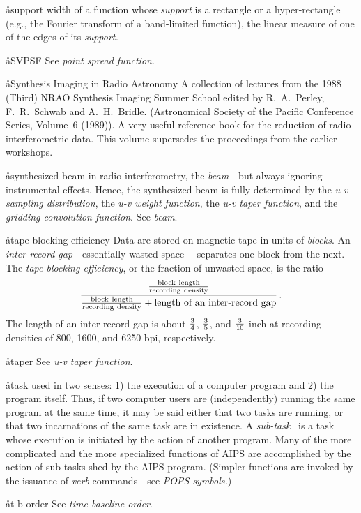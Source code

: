 \aa{support width}
of a function whose {\it support} is a rectangle or
a hyper-rectangle (e.g., the Fourier transform of a band-limited function),
the linear measure of one of the edges of its {\it support.}

\aa{SVPSF} See {\it point spread function}.

\aa{Synthesis Imaging in Radio Astronomy}
A collection of lectures from the 1988 (Third) NRAO Synthesis Imaging
Summer School edited by R.\ A.\ Perley, F.\ R.\ Schwab and A.\ H.\ Bridle.
(Astronomical Society of the Pacific Conference Series, Volume~6 (1989)).
A very useful reference book for the reduction of radio interferometric data.
This volume supersedes the proceedings from the earlier workshops.

\aa{synthesized beam}
in radio interferometry, the {\it beam}---but always ignoring
instrumental effects.
Hence, the synthesized beam is fully determined by the
{\it u-v sampling distribution},
the {\it u-v weight function}, the {\it u-v taper function},
and the {\it gridding convolution function}.
See {\it beam}.

\aa{tape blocking efficiency}
Data are stored on magnetic tape in units of {\it blocks}.
An {\it inter-record gap}\/---essentially wasted space---%
separates one block from the next.
The {\it tape blocking efficiency}, or the fraction of unwasted space,
is the ratio
\def\bl{\operatorname{block\ length}}
\def\rd{\operatorname{recording\ density}}
$${ {\bl\over\rd}\over{\bl\over\rd}+
\text{length of an inter-record gap} }\,.$$
The length of an inter-record gap is
about ${3\over4}$, ${3\over5}$, and ${3\over10}$ inch
at recording densities of 800, 1600, and 6250 bpi, respectively.


\aa{taper} See {\it u-v taper function}.

\aa{task}
used in two senses: 1) the execution of a computer program
and 2) the program itself.
Thus, if two computer users are (independently) running the
same program at the same time, it may be said either that
two tasks are running, or that two incarnations of the same
task are in existence.
A {\it sub-task} \qv\ is a task whose execution is initiated
by the action of another program.
Many of the
more complicated and the more specialized functions of AIPS are
accomplished by the action of sub-tasks shed
by the AIPS program.
(Simpler functions are invoked by the issuance
of {\it verb} commands---see {\it POPS symbols.})

\aa{t-b order} See {\it time-baseline order}.

